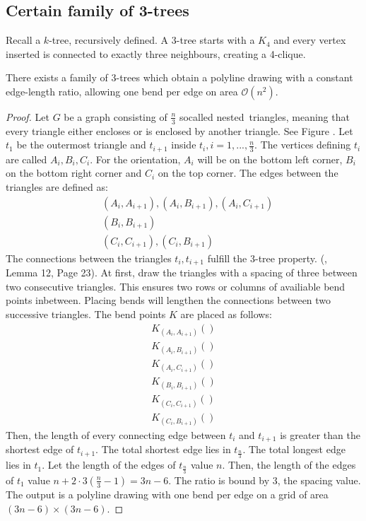 \subsection{Certain family of 3-trees}
Recall a $k$-tree, recursively defined. A 3-tree starts with a $K_4$ and every vertex inserted is connected to exactly three neighbours, creating a 4-clique.
\begin{theorem}
	There exists a family of 3-trees which obtain a polyline drawing with a constant edge-length ratio, allowing one bend per edge on area $\mathcal{O}(n^2)$.
\end{theorem}
\begin{proof}
	Let $G$ be a graph consisting of $\frac{n}{3}$ socalled \grqq nested\grqq~triangles, meaning that every triangle either encloses or is enclosed by another triangle. See Figure . Let $t_1$ be the outermost triangle and $t_{i+1}$ inside $t_i,i=1,...,\frac{n}{3}$. The vertices defining $t_i$ are called $A_i,B_i,C_i$. For the orientation, $A_i$ will be on the bottom left corner, $B_i$ on the bottom right corner and $C_i$ on the top corner. The edges between the triangles are defined as:
	\begin{align}
		&(A_i,A_{i+1}),(A_i,B_{i+1}),(A_i,C_{i+1})\\
		&(B_i,B_{i+1})\\
		&(C_i,C_{i+1}),(C_i,B_{i+1})
	\end{align}
	The connections between the triangles $t_i,t_{i+1}$ fulfill the 3-tree property. (\cite{DBLP:journals/jgaa/MondalNRA11}, Lemma 12, Page 23).
	At first, draw the triangles with a spacing of three between two consecutive triangles. This ensures two rows or columns of availiable bend points inbetween. Placing bends will lengthen the connections between two successive triangles. The bend points $K$ are placed as follows:
	\begin{align}
		K_{(A_i,A_{i+1})}()\\
		K_{(A_i,B_{i+1})}()\\
		K_{(A_i,C_{i+1})}()\\
		K_{(B_i,B_{i+1})}()\\
		K_{(C_i,C_{i+1})}()\\
		K_{(C_i,B_{i+1})}()
	\end{align}
	Then, the length of every connecting edge between $t_i$ and $t_{i+1}$ is greater than the shortest edge of $t_{i+1}$. The total shortest edge lies in $t_{\frac{n}{3}}$. The total longest edge lies in $t_1$. Let the length of the edges of $t_{\frac{n}{3}}$ value $n$. Then, the length of the edges of $t_1$ value $n+2\cdot 3\left(\frac{n}{3}-1\right) = 3n-6$. The ratio is bound by 3, the spacing value. The output is a polyline drawing with one bend per edge on a grid of area $(3n-6)\times(3n-6)$.
\end{proof}
